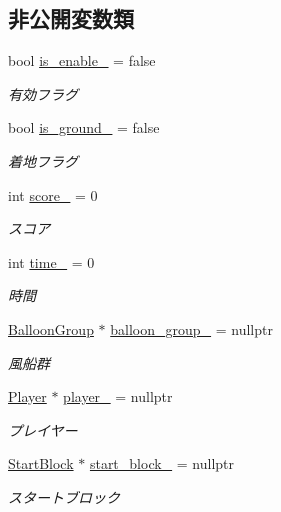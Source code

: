 \subsection*{非公開変数類}
\begin{DoxyCompactItemize}
\item 
bool \mbox{\hyperlink{class_stage_manager_a9b693a434f2aec42739c19daf6087da4}{is\+\_\+enable\+\_\+}} = false
\begin{DoxyCompactList}\small\item\em 有効フラグ \end{DoxyCompactList}\item 
bool \mbox{\hyperlink{class_stage_manager_a80276fabfcdccd74dfd52fd2cc61b1db}{is\+\_\+ground\+\_\+}} = false
\begin{DoxyCompactList}\small\item\em 着地フラグ \end{DoxyCompactList}\item 
int \mbox{\hyperlink{class_stage_manager_a21bdb2371d84c916dd594c453c50701e}{score\+\_\+}} = 0
\begin{DoxyCompactList}\small\item\em スコア \end{DoxyCompactList}\item 
int \mbox{\hyperlink{class_stage_manager_afdb8bffaa00e7c4ed1ebbf136137f6e6}{time\+\_\+}} = 0
\begin{DoxyCompactList}\small\item\em 時間 \end{DoxyCompactList}\item 
\mbox{\hyperlink{class_balloon_group}{Balloon\+Group}} $\ast$ \mbox{\hyperlink{class_stage_manager_aac234fd37fef3fe233489e75c803ac47}{balloon\+\_\+group\+\_\+}} = nullptr
\begin{DoxyCompactList}\small\item\em 風船群 \end{DoxyCompactList}\item 
\mbox{\hyperlink{class_player}{Player}} $\ast$ \mbox{\hyperlink{class_stage_manager_a378c995a369018f8595ba5cf4ab947d2}{player\+\_\+}} = nullptr
\begin{DoxyCompactList}\small\item\em プレイヤー \end{DoxyCompactList}\item 
\mbox{\hyperlink{class_start_block}{Start\+Block}} $\ast$ \mbox{\hyperlink{class_stage_manager_a0ce3838c9fe4eaa1c9f8a6ecf361ea7a}{start\+\_\+block\+\_\+}} = nullptr
\begin{DoxyCompactList}\small\item\em スタートブロック \end{DoxyCompactList}\item 

\end{DoxyCompactItemize}
